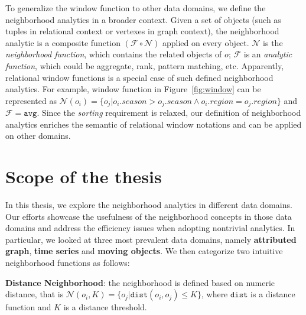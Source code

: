 To generalize the window function to other data domains, we define the neighborhood
analytics in a broader context. Given a set of objects 
(such as tuples in relational context or vertexes in graph context),
the neighborhood analytic is a composite function
$(\mathcal{F} \circ \mathcal{N})$ applied on every object. $\mathcal{N}$
is the \emph{neighborhood function}, which contains the related objects of $o$;
$\mathcal{F}$ is an \emph{analytic function}, which could be aggregate, rank,
pattern matching, etc.
Apparently, relational window functions is a special case of such defined 
neighborhood analytics. For example, window function in Figure~\ref{fig:window} 
can be represented as $\mathcal{N}(o_i)=\{o_j | o_i.season > o_j.season \wedge o_i.region = o_j.region\}$
and $\mathcal{F} = \mathtt{avg}$.
Since the \emph{sorting} requirement is relaxed, our definition of neighborhood analytics
enriches the semantic of relational window notations 
and can be applied on other domains.
%
%
%


\section{Scope of the thesis}
In this thesis, we explore the neighborhood analytics in
different data domains. Our efforts showcase the usefulness of the neighborhood
concepts in those data domains and address the efficiency issues when adopting
nontrivial analytics. In particular, we looked at three most prevalent data domains, namely \textbf{attributed graph},
\textbf{time series} and \textbf{moving objects}. 
We then categorize two intuitive neighborhood functions as follows:

\textbf{Distance Neighborhood}: the neighborhood is defined based on numeric distance, that is $\mathcal{N}(o_i,K) = \{o_j | \mathtt{dist}(o_i,o_j) \leq K \}$, where $\mathtt{dist}$ is a distance function and $K$ is a distance threshold.

